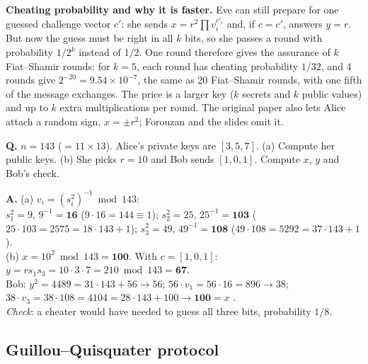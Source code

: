 \textbf{Cheating probability and why it is faster.} Eve can still prepare for one guessed challenge vector $c'$: she sends $x = r^2 \prod v_i^{c'_i}$ and, if $c = c'$, answers $y = r$. But now the guess must be right in all $k$ bits, so she passes a round with probability $1/2^k$ instead of $1/2$. One round therefore gives the assurance of $k$ Fiat--Shamir rounds: for $k = 5$, each round has cheating probability $1/32$, and 4 rounds give $2^{-20} = 9.54 \times 10^{-7}$, the same as 20 Fiat--Shamir rounds, with one fifth of the message exchanges. The price is a larger key ($k$ secrets and $k$ public values) and up to $k$ extra multiplications per round. The original paper also lets Alice attach a random sign, $x = \pm r^2$; Forouzan and the slides omit it.

\begin{worked}[: Feige--Fiat--Shamir with $k = 3$]
\textbf{Q.} $n = 143$ ($= 11 \times 13$). Alice's private keys are $[3, 5, 7]$. (a) Compute her public keys. (b) She picks $r = 10$ and Bob sends $[1, 0, 1]$. Compute $x$, $y$ and Bob's check.

\textbf{A.} (a) $v_i = (s_i^2)^{-1} \bmod 143$:\\
$s_1^2 = 9$, $9^{-1} = \mathbf{16}$ ($9 \cdot 16 = 144 \equiv 1$); \;$s_2^2 = 25$, $25^{-1} = \mathbf{103}$ ($25 \cdot 103 = 2575 = 18 \cdot 143 + 1$); \;$s_3^2 = 49$, $49^{-1} = \mathbf{108}$ ($49 \cdot 108 = 5292 = 37 \cdot 143 + 1$).\\
(b) $x = 10^2 \bmod 143 = \mathbf{100}$. With $c = [1, 0, 1]$: $y = r s_1 s_3 = 10 \cdot 3 \cdot 7 = 210 \bmod 143 = \mathbf{67}$.\\
Bob: $y^2 = 4489 = 31 \cdot 143 + 56 \to 56$; \;$56 \cdot v_1 = 56 \cdot 16 = 896 \to 38$; \;$38 \cdot v_3 = 38 \cdot 108 = 4104 = 28 \cdot 143 + 100 \to \mathbf{100} = x$ \checkmark.\\
\emph{Check}: a cheater would have needed to guess all three bits, probability $1/8$.
\end{worked}

\subsection{Guillou--Quisquater protocol \new}

